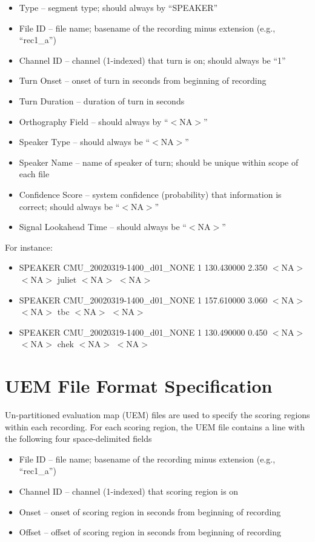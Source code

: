 \documentclass{article}
\begin{document}
\begin{appendices}
\begin{itemize}
    \item Type  --  segment type; should always by ``SPEAKER''
    \item File ID  --  file name; basename of the recording minus extension (e.g., ``rec1\_a'')
    \item Channel ID  --  channel (1-indexed) that turn is on; should always be ``1''
    \item Turn Onset  --  onset of turn in seconds from beginning of recording
    \item Turn Duration  -- duration of turn in seconds
    \item Orthography Field --  should always by ``$<$NA$>$''
    \item Speaker Type  --  should always be ``$<$NA$>$''
    \item Speaker Name  --  name of speaker of turn; should be unique within scope of each file
    \item Confidence Score  --  system confidence (probability) that information is correct; should always be ``$<$NA$>$''
    \item Signal Lookahead Time  --  should always be ``$<$NA$>$''
\end{itemize}

For instance:
%
\begin{itemize}
    \item []SPEAKER CMU_20020319-1400_d01_NONE 1 130.430000 2.350 $<$NA$>$ $<$NA$>$ juliet $<$NA$>$ $<$NA$>$
    \item[] SPEAKER CMU_20020319-1400_d01_NONE 1 157.610000 3.060 $<$NA$>$ $<$NA$>$ tbc $<$NA$>$ $<$NA$>$
    \item[] SPEAKER CMU_20020319-1400_d01_NONE 1 130.490000 0.450 $<$NA$>$ $<$NA$>$ chek $<$NA$>$ $<$NA$>$
\end{itemize}




\newpage
\section{UEM File Format Specification}
\label{app:uem}
Un-partitioned evaluation map (UEM) files are used to specify the scoring regions within each recording. For each scoring region, the UEM file contains a line with the following four space-delimited fields
%
\begin{itemize}
    \item File ID  --  file name; basename of the recording minus extension (e.g., ``rec1_a'')
    \item Channel ID  --  channel (1-indexed) that scoring region is on
    \item Onset  --  onset of scoring region in seconds from beginning of recording
    \item Offset  --  offset of scoring region in seconds from beginning of recording
\end{itemize}


\end{appendices}
\end{document}
